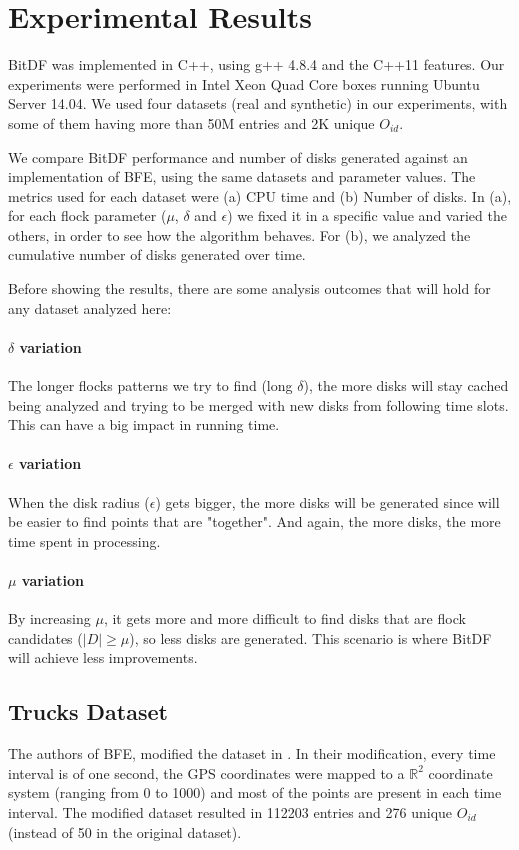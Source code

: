 \chapter{Experimental Results}
\label{chp:results}
BitDF was implemented in C++, using g++ 4.8.4 and the C++11 features. Our experiments were performed in Intel Xeon Quad
Core boxes running Ubuntu Server 14.04. We used four datasets (real and synthetic) in our experiments, with some of them
having more than 50M entries and 2K unique $O_{id}$.

We compare BitDF performance and number of disks generated against an implementation of BFE, using the same datasets
and parameter values. The metrics used for each dataset were (a) CPU time and (b) Number of disks. In (a), for each
flock parameter ($\mu$, $\delta$ and $\epsilon$) we fixed it in a specific value and varied the others, in order to see
how the algorithm behaves. For (b), we analyzed the cumulative number of disks generated over time.

Before showing the results, there are some analysis outcomes that will hold for any dataset analyzed here:

\subsubsection{$\delta$ variation}
\label{sssec:lvariation}
The longer flocks patterns we try to find (long $\delta$), the more disks will stay cached being analyzed and trying to
be merged with new disks from following time slots. This can have a big impact in running time.

\subsubsection{$\epsilon$ variation}
\label{sssec:gvariation}
When the disk radius ($\epsilon$) gets bigger, the more disks will be generated since will be easier to find points that
are "together". And again, the more disks, the more time spent in processing.

\subsubsection{$\mu$ variation}
\label{sssec:nvariation}
By increasing $\mu$, it gets more and more difficult to find disks that are flock candidates ($|D| \ge \mu$), so less
disks are generated. This scenario is where BitDF will achieve less improvements.

\section{Trucks Dataset}
\label{subsec:trucks}
The authors of BFE, modified the dataset in \cite{bib:trucksdataset}. In their modification, every time interval is of
one second, the GPS coordinates were mapped to a $\mathbb{R}^2$ coordinate system (ranging from 0 to 1000) and most of
the points are present in each time interval. The modified dataset resulted in 112203 entries and 276 unique $O_{id}$
(instead of 50 in the original dataset).


